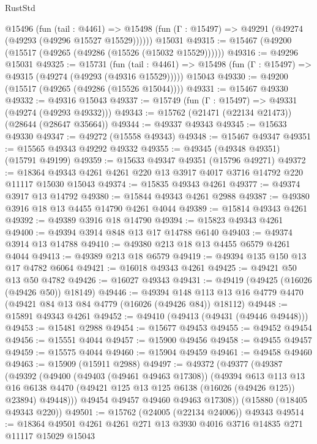 \begin{lexlean}{RustStd}
\begin{coremodule}
    @15496
      (fun (tail : @4461) =>
      @15498 (fun (Γ : @15497) => @49291 (@49274 (@49293 (@49296 @15527 @15529))))))
    @15031
@49315 := @15467 (@49200 (@15517 (@49265 (@49286 (@15526 (@15032 @15529))))))
@49316 := @49296 @15031
@49325 := @15731
    (fun (tail : @4461) => @15498 (fun (Γ : @15497) => @49315 (@49274 (@49293 (@49316 @15529)))))
    @15043
@49330 := @49200 (@15517 (@49265 (@49286 (@15526 @15044))))
@49331 := @15467 @49330
@49332 := @49316 @15043
@49337 := @15749 (fun (Γ : @15497) => @49331 (@49274 (@49293 @49332)))
@49343 := @15762 (@21471 (@22134 @21473)) (@28644 (@28647 @35664))
@49344 := @49337 @49343
@49345 := @15633 @49330
@49347 := @49272 (@15558 @49343)
@49348 := @15467 @49347
@49351 := @15565 @49343 @49292 @49332
@49355 := @49345 (@49348 @49351) (@15791 @49199)
@49359 := @15633 @49347 @49351 (@15796 @49271)
@49372 := @18364 @49343 @4261 @4261 @220 @13 @3917 @4017 @3716 @14792 @220 @11117 @15030 @15043
@49374 := @15835 @49343 @4261
@49377 := @49374 @3917 @13 @14792
@49380 := @15844 @49343 @4261 @2988
@49387 := @49380 @3916 @18 @13 @4455 @14790 @4261 @4044
@49389 := @15814 @49343 @4261
@49392 := @49389 @3916 @18 @14790
@49394 := @15823 @49343 @4261
@49400 := @49394 @3914 @848 @13 @17 @14788 @6140
@49403 := @49374 @3914 @13 @14788
@49410 := @49380 @213 @18 @13 @4455 @6579 @4261 @4044
@49413 := @49389 @213 @18 @6579
@49419 := @49394 @135 @150 @13 @17 @4782 @6064
@49421 := @16018 @49343 @4261
@49425 := @49421 @50 @13 @50 @4782
@49426 := @16027 @49343
@49431 := @49419 (@49425 (@16026 (@49426 @50)) @18149)
@49446 := @49394
    @148
    @113
    @13
    @16
    @4779
    @4470
    (@49421 @84 @13 @84 @4779 (@16026 (@49426 @84)) @18112)
@49448 := @15891 @49343 @4261
@49452 := @49410 (@49413 (@49431 (@49446 @49448)))
@49453 := @15481 @2988
@49454 := @15677 @49453
@49455 := @49452 @49454
@49456 := @15551 @4044
@49457 := @15900 @49456
@49458 := @49455 @49457
@49459 := @15575 @4044
@49460 := @15904 @49459
@49461 := @49458 @49460
@49463 := @15909 (@15911 @2988)
@49497 := @49372
    (@49377
      (@49387
        (@49392
          (@49400
            (@49403 (@49461 @49463 @17308))
            (@49394
              @613
              @113
              @13
              @16
              @6138
              @4470
              (@49421 @125 @13 @125 @6138 (@16026 (@49426 @125)) @23894)
              @49448)))
        @49454
        @49457
        @49460
        @49463
        @17308))
    (@15880 (@18405 @49343 @220))
@49501 := @15762 (@24005 (@22134 @24006)) @49343
@49514 := @18364 @49501 @4261 @4261 @271 @13 @3930 @4016 @3716 @14835 @271 @11117 @15029 @15043

\end{coremodule}
\end{lexlean}
